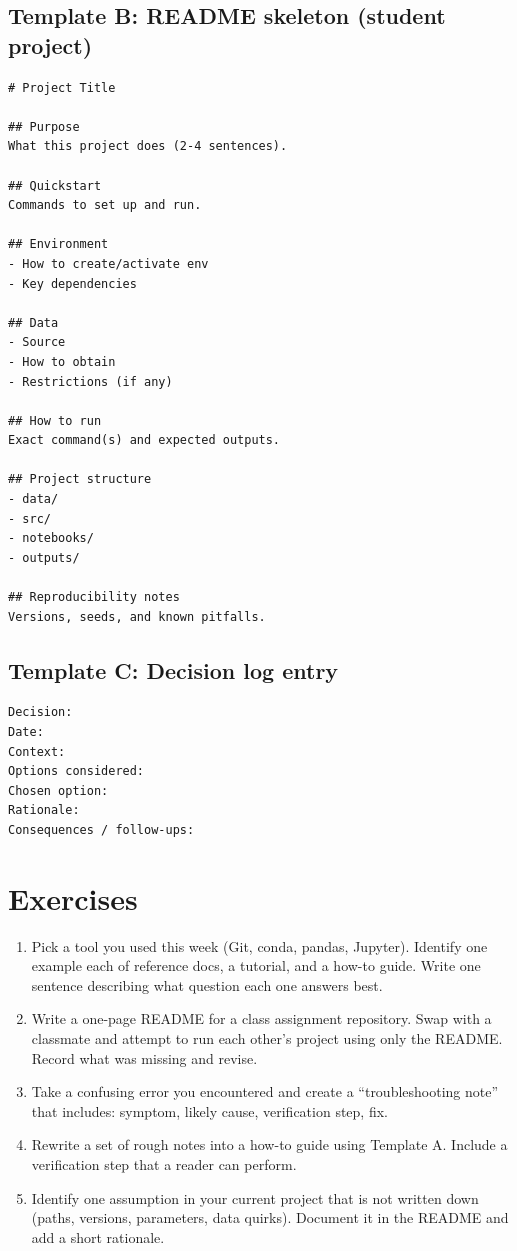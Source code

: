 \subsection{Template B: README skeleton (student project)}
\begin{verbatim}
# Project Title

## Purpose
What this project does (2-4 sentences).

## Quickstart
Commands to set up and run.

## Environment
- How to create/activate env
- Key dependencies

## Data
- Source
- How to obtain
- Restrictions (if any)

## How to run
Exact command(s) and expected outputs.

## Project structure
- data/
- src/
- notebooks/
- outputs/

## Reproducibility notes
Versions, seeds, and known pitfalls.
\end{verbatim}

\subsection{Template C: Decision log entry}
\begin{verbatim}
Decision:
Date:
Context:
Options considered:
Chosen option:
Rationale:
Consequences / follow-ups:
\end{verbatim}

\section{Exercises}
\begin{enumerate}[noitemsep]
  \item Pick a tool you used this week (Git, conda, pandas, Jupyter). Identify one example each of reference docs, a tutorial, and a how-to guide. Write one sentence describing what question each one answers best.
  \item Write a one-page README for a class assignment repository. Swap with a classmate and attempt to run each other’s project using only the README. Record what was missing and revise.
  \item Take a confusing error you encountered and create a “troubleshooting note” that includes: symptom, likely cause, verification step, fix.
  \item Rewrite a set of rough notes into a how-to guide using Template A. Include a verification step that a reader can perform.
  \item Identify one assumption in your current project that is not written down (paths, versions, parameters, data quirks). Document it in the README and add a short rationale.
\end{enumerate}

